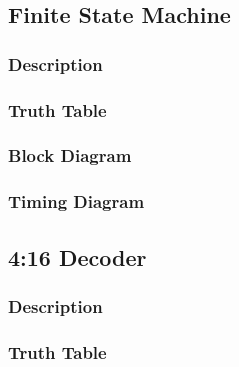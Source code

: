 
\subsection{{Finite State Machine}}

	\subsubsection{{Description}}
	
		{}
	
	\subsubsection{{Truth Table}}
	
		{}
	
	\subsubsection{{Block Diagram}}
	
		{}
	
	\subsubsection{{Timing Diagram}}
	
		{}

\subsection{{4:16 Decoder}}

	\subsubsection{{Description}}
	
		{}
	
	\subsubsection{{Truth Table}}
	
